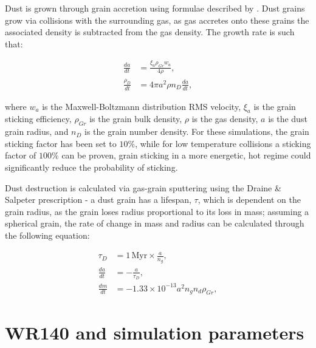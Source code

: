 \documentclass[fleqn,usenatbib]{mnras}
\begin{document}
Dust is grown through grain accretion using formulae described by \citep{spitzer_jr._physical_2008}. Dust grains grow via collisions with the surrounding gas, as gas accretes onto these grains the associated density is subtracted from the gas density. The growth rate is such that:


\begin{subequations}
  \begin{align}
        \frac{da}{dt} & = \frac{\xi_a \rho_{Gr} w_a}{4 \rho} , \\
    \frac{\rho_D}{dt} & = 4 \pi a^2 \rho n_D \frac{da}{dt}   , 
  \end{align}
\end{subequations}

where $w_a$ is the Maxwell-Boltzmann distribution RMS velocity, $\xi_a$ is the grain sticking efficiency, $\rho_{Gr}$ is the grain bulk density, $\rho$ is the gas density, $a$ is the dust grain radius, and $n_D$ is the grain number density. For these simulations, the grain sticking factor has been set to $10\%$, while for low temperature collisions a sticking factor of $100\%$ can be proven, grain sticking in a more energetic, hot regime could significantly reduce the probability of sticking. 

Dust destruction is calculated via gas-grain sputtering using the Draine \& Salpeter prescription - a dust grain has a lifespan, $\tau$, which is dependent on the grain radius, as the grain loses radius proportional to its loss in mass; assuming a spherical grain, the rate of change in mass and radius can be calculated through the following equation:

\begin{subequations}
  \begin{align}
           \tau_D & = 1 \, \text{Myr} \times \frac{a}{n_g} , \\
    \frac{da}{dt} & = - \frac{a}{\tau_D} , \\
    \frac{dm}{dt} & = -1.33 \times 10^{-13} a^2 n_g n_d \rho_{Gr} ,
  \end{align}
\end{subequations}

\section{WR140 and simulation parameters}
\label{sec:paper2-wr140}
\end{document}
